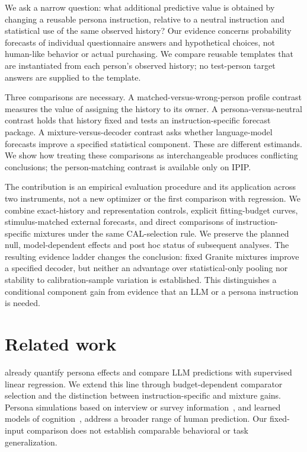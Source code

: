 \documentclass[11pt]{article}
\begin{document}
We ask a narrow question: what additional predictive value is obtained by changing a reusable persona instruction, relative to a neutral instruction and statistical use of the same observed history? Our evidence concerns probability forecasts of individual questionnaire answers and hypothetical choices, not human-like behavior or actual purchasing. We compare reusable templates that are instantiated from each person's observed history; no test-person target answers are supplied to the template.

Three comparisons are necessary. A matched-versus-wrong-person profile contrast measures the value of assigning the history to its owner. A persona-versus-neutral contrast holds that history fixed and tests an instruction-specific forecast package. A mixture-versus-decoder contrast asks whether language-model forecasts improve a specified statistical component. These are different estimands. We show how treating these comparisons as interchangeable produces conflicting conclusions; the person-matching contrast is available only on IPIP.

The contribution is an empirical evaluation procedure and its application across two instruments, not a new optimizer or the first comparison with regression. We combine exact-history and representation controls, explicit fitting-budget curves, stimulus-matched external forecasts, and direct comparisons of instruction-specific mixtures under the same CAL-selection rule. We preserve the planned null, model-dependent effects and post hoc status of subsequent analyses. The resulting evidence ladder changes the conclusion: fixed Granite mixtures improve a specified decoder, but neither an advantage over statistical-only pooling nor stability to calibration-sample variation is established. This distinguishes a conditional component gain from evidence that an LLM or a persona instruction is needed.

\section{Related work}
\citet{hu2024persona} already quantify persona effects and compare LLM predictions with supervised linear regression. We extend this line through budget-dependent comparator selection and the distinction between instruction-specific and mixture gains. Persona simulations based on interview or survey information~\citep{park2026selfreports}, and learned models of cognition~\citep{binz2025centaur}, address a broader range of human prediction. Our fixed-input comparison does not establish comparable behavioral or task generalization.
\end{document}
